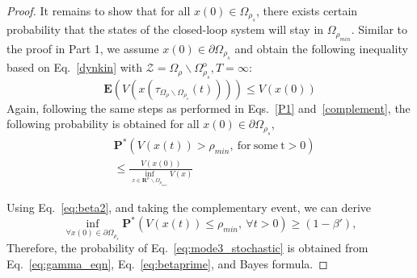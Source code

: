 \documentclass[letterpaper, 10pt, conference]{ieeeconf}
\begin{document}
\begin{proof}
It remains to show that for all $x(0) \in \Omega_{\rho_s}$, there exists certain probability that the states of the closed-loop system will stay in $\Omega_{\rho_{min}}$. Similar to the proof in Part 1, we assume $x(0) \in \partial \Omega_{\rho_s}$ and obtain the following inequality based on Eq.~\ref{dynkin} with $\mathcal{Z}=\Omega_{\rho} \backslash \Omega_{\rho_s}^{\text{o}}, T= \infty$:
\begin{equation}\label{eq:Dynkin3}
\mathbf{E}(V(x(\tau_{\Omega_{\rho} \backslash \Omega_{\rho_s}}(t)))) \leq V(x(0)) 
\end{equation}
Again, following the same steps as performed in Eqs.~\ref{P1} and~\ref{complement}, the following probability is obtained for all $x(0) \in \partial \Omega_{\rho_s}$,
\begin{equation}\label{P2}
	\begin{aligned}
	&\mathbf{P}^*(V(x(t)) > \rho_{min},~\mathrm{for~some~t} >0 ) \\
	&\leq \frac{V(x(0))}{\inf_{x \in \mathbf{R}^n \backslash {\Omega_{\rho_{min}} }} V(x)}
	\end{aligned}
\end{equation}

Using Eq.~\ref{eq:beta2}, and taking the complementary event, we can derive
\begin{equation}\label{eq:betaprime}
\inf \limits_{\forall x(0) \in \partial\Omega_{\rho_s}} \mathbf{P}^*(V(x(t)) \leq \rho_{min},~\forall t > 0 ) \geq (1-\beta'), 
\end{equation}
Therefore, the probability of Eq.~\ref{eq:mode3_stochastic} is obtained from Eq.~\ref{eq:gamma_eqn}, Eq.~\ref{eq:betaprime}, and Bayes formula.
\end{proof}
\end{document}
